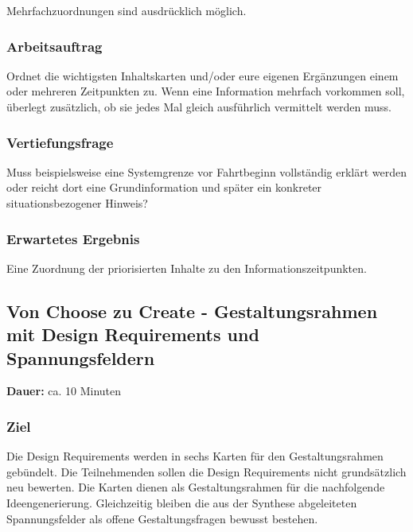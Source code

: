 Mehrfachzuordnungen sind ausdrücklich möglich.

\subsubsection*{Arbeitsauftrag}

Ordnet die wichtigsten Inhaltskarten und/oder eure eigenen Ergänzungen einem oder mehreren Zeitpunkten zu. Wenn eine Information mehrfach vorkommen soll, überlegt zusätzlich, ob sie jedes Mal gleich ausführlich vermittelt werden muss.

\subsubsection*{Vertiefungsfrage}

Muss beispielsweise eine Systemgrenze vor Fahrtbeginn vollständig
erklärt werden oder reicht dort eine Grundinformation und später ein
konkreter situationsbezogener Hinweis?

\subsubsection*{Erwartetes Ergebnis}

Eine Zuordnung der priorisierten Inhalte zu den Informationszeitpunkten.


\clearpage

\subsection{Von Choose zu Create - Gestaltungsrahmen mit Design Requirements und Spannungsfeldern}
\label{subsec:workshop-gestaltungsrahmen}

\noindent
\textbf{Dauer:} ca. 10 Minuten

\subsubsection*{Ziel}

Die Design Requirements werden in sechs Karten für den
Gestaltungsrahmen gebündelt. Die Teilnehmenden sollen die Design Requirements nicht grundsätzlich neu bewerten. Die Karten dienen als Gestaltungsrahmen für die nachfolgende Ideengenerierung. Gleichzeitig bleiben die aus der Synthese abgeleiteten Spannungsfelder als offene Gestaltungsfragen bewusst bestehen.

